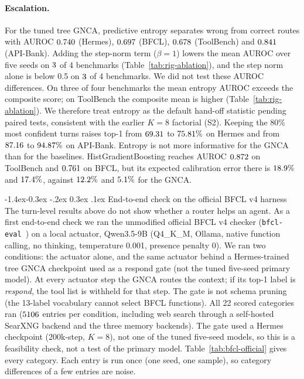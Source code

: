 \documentclass[10pt,twocolumn,letterpaper]{article}
\makeatletter
\renewcommand\subsection{\@startsection{subsection}{2}{\z@}%
  {-1.4ex\@plus -0.3ex \@minus -.2ex}%
  {0.3ex \@plus .1ex}%
  {\normalfont\normalsize\bfseries}}
\makeatother
\begin{document}
\paragraph{Escalation.} For the tuned tree GNCA, predictive entropy separates wrong from correct routes with AUROC $0.740$ (Hermes), $0.697$ (BFCL), $0.678$ (ToolBench) and $0.841$ (API-Bank). Adding the step-norm term ($\beta{=}1$) lowers the mean AUROC over five seeds on $3$ of 4 benchmarks (Table~\ref{tab:rig-ablation}), and the step norm alone is below 0.5 on $3$ of 4 benchmarks. We did not test these AUROC differences. On three of four benchmarks the mean entropy AUROC exceeds the composite score; on ToolBench the composite mean is higher (Table~\ref{tab:rig-ablation}). We therefore treat entropy as the default hand-off statistic pending paired tests, consistent with the earlier $K{=}8$ factorial (S2). Keeping the 80\% most confident turns raises top-1 from $69.31$ to $75.81\%$ on Hermes and from $87.16$ to $94.87\%$ on API-Bank. Entropy is not more informative for the GNCA than for the baselines. HistGradientBoosting reaches AUROC $0.872$ on ToolBench and $0.761$ on BFCL, but its expected calibration error there is $18.9\%$ and $17.4\%$, against $12.2\%$ and $5.1\%$ for the GNCA.

\subsection{End-to-end check on the official BFCL v4 harness}\label{sec:bfcl-official}
The turn-level results above do not show whether a router helps an agent. As a first end-to-end check we ran the unmodified official BFCL v4 checker (\texttt{bfcl-eval}~\cite{bfcl-eval}) on a local actuator, Qwen3.5-9B (Q4\_K\_M, Ollama, native function calling, no thinking, temperature 0.001, presence penalty 0). We ran two conditions: the actuator alone, and the same actuator behind a Hermes-trained tree GNCA checkpoint used as a respond gate (not the tuned five-seed primary model). At every actuator step the GNCA routes the context; if its top-1 label is \emph{respond}, the tool list is withheld for that step. The gate is not schema pruning (the 13-label vocabulary cannot select BFCL functions). All 22 scored categories ran ($5106$ entries per condition, including web search through a self-hosted SearXNG backend and the three memory backends). The gate used a Hermes checkpoint (200k-step, $K{=}8$), not one of the tuned five-seed models, so this is a feasibility check, not a test of the primary model. Table~\ref{tab:bfcl-official} gives every category. Each entry is run once (one seed, one sample), so category differences of a few entries are noise.
\end{document}
